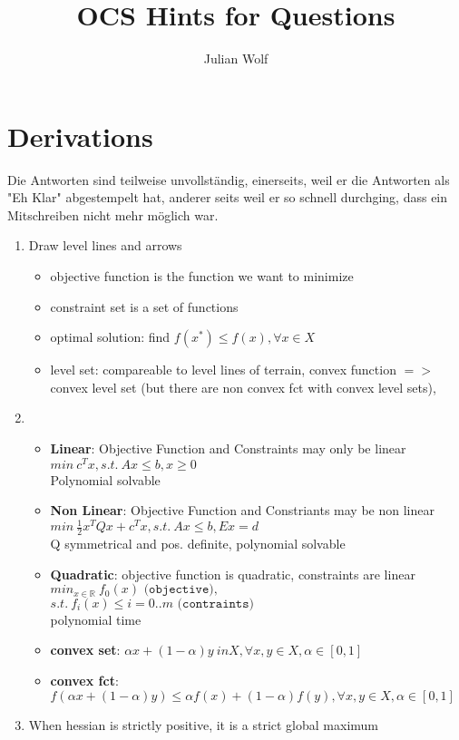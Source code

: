 \documentclass{report}
\title{OCS Hints for Questions}
\author{Julian Wolf}
\begin{document}
\maketitle
\section*{Derivations}
Die Antworten sind teilweise unvollständig, einerseits, weil er die Antworten als "Eh Klar" abgestempelt hat, anderer seits weil er so schnell durchging, dass ein Mitschreiben nicht mehr möglich war. 

\begin{enumerate}
\item Draw level lines and arrows
\begin{itemize}
\item objective function is the function we want to minimize
\item constraint set is a set of functions
\item optimal solution: find $f(x^*) \leq f(x), \forall x \in X$
\item level set: compareable to level lines of terrain, convex function $=>$ convex level set (but there are non convex fct with convex level sets), 
\end{itemize}

\item 
\begin{itemize}
\item \textbf{Linear}: Objective Function and Constraints may only be linear
$min\ c^Tx, s.t.\ Ax \leq b, x \geq 0$\\
Polynomial solvable
\item \textbf{Non Linear}: Objective Function and Constriants may  be non linear
$min\ \frac{1}{2} x^TQx + c^Tx, s.t.\ Ax \leq b, Ex = d$\\
Q symmetrical and pos. definite, polynomial solvable
\item \textbf{Quadratic}: objective function is quadratic, constraints are linear	
$min_{x \in \mathbb{R}}\ f_0(x) \texttt{ (objective)},$\\
$s.t.\ f_i(x) \leq i=0..m \texttt{ (contraints)}$\\
polynomial time
\item \textbf{convex set}: 
$\alpha x + (1 - \alpha)y \ in X, \forall x, y \in X, \alpha \in [0, 1]$
\item \textbf{convex fct}:
$f(\alpha x + (1 - \alpha)y) \leq \alpha f(x) + (1 - \alpha)f(y) , \forall x, y \in X, \alpha \in [0, 1]$ 
\end{itemize}
\item When hessian is strictly positive, it is a strict global maximum


\end{enumerate}
\end{document}
